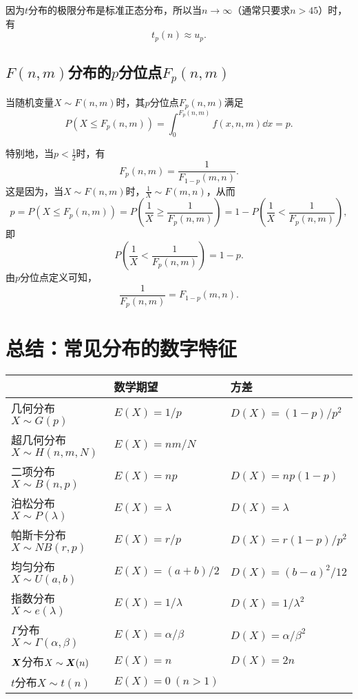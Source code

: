 因为\(t\)分布的极限分布是标准正态分布，所以当\(n\to\infty\)（通常只要求\(n>45\)）时，有\[
t_p(n) \approx u_p.
\]

\subsection{\texorpdfstring{\(F(n,m)\)分布的\(p\)分位点\(F_p(n,m)\)}{F分布的p分位点}}
当随机变量\(X \sim F(n,m)\)时，其\(p\)分位点\(F_p(n,m)\)满足\[
P(X \leqslant F_p(n,m)) = \int_0^{F_p(n,m)} f(x,n,m) \dd{x} = p.
\]

特别地，当\(p<\frac{1}{2}\)时，有\begin{equation}
F_p(n,m) = \frac{1}{F_{1-p}(m,n)}.
\end{equation}
这是因为，当\(X \sim F(n,m)\)时，\(\frac{1}{X} \sim F(m,n)\)，从而\[
p = P(X \leqslant F_p(n,m))
= P\left(\frac{1}{X} \geqslant \frac{1}{F_p(n,m)}\right)
= 1 - P\left(\frac{1}{X} < \frac{1}{F_p(n,m)}\right),
\]即\[
P\left(\frac{1}{X} < \frac{1}{F_p(n,m)}\right) = 1 - p.
\]由\(p\)分位点定义可知，\[
\frac{1}{F_p(n,m)} = F_{1-p}(m,n).
\]

\section{总结：常见分布的数字特征}
\begin{center}
\begin{tabular}{p{4cm}p{4cm}p{4cm}}
\hline
& 数学期望 & 方差 \\ \hline
几何分布\newline\(X \sim G(p)\) & \(E(X) = 1/p\) & \(D(X) = (1-p)/p^2\) \\ \hline
超几何分布\newline\(X \sim H(n,m,N)\) & \(E(X) = nm/N\) \\ \hline
二项分布\newline\(X \sim B(n,p)\) & \(E(X) = np\) & \(D(X) = np(1-p)\) \\ \hline
泊松分布\newline\(X \sim P(\lambda)\) & \(E(X) = \lambda\) & \(D(X) = \lambda\) \\ \hline
帕斯卡分布\newline\(X \sim NB(r,p)\) & \(E(X) = r/p\) & \(D(X) = r(1-p)/p^2\) \\ \hline
均匀分布\newline\(X \sim U(a,b)\) & \(E(X) = (a+b)/2\) & \(D(X) = (b-a)^2/12\) \\ \hline
指数分布\newline\(X \sim e(\lambda)\) & \(E(X) = 1/\lambda\) & \(D(X) = 1/\lambda^2\) \\ \hline
\(\Gamma\)分布\newline\(X \sim \Gamma(\alpha,\beta)\) & \(E(X) = \alpha/\beta\) & \(D(X) = \alpha/\beta^2\) \\ \hline
\(\boldsymbol{X}\)分布\newline\(X \sim \boldsymbol{X}(n)\) & \(E(X) = n\) & \(D(X) = 2n\) \\ \hline
\(t\)分布\newline\(X \sim t(n)\) & \(E(X) = 0\ (n>1)\) \\ \hline
\end{tabular}
\end{center}

